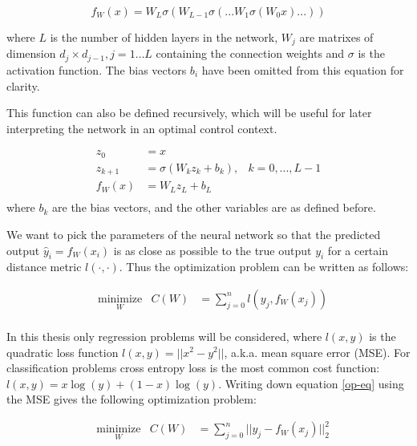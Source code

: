 \begin{equation}
         f_W(x) = W_L\sigma(W_{L-1}\sigma(...W_1\sigma(W_0x)...))
\end{equation}

where $L$ is the number of hidden layers in the network, $W_j$ are matrixes of dimension $d_j \times d_{j-1}, j=1 \dots L$ containing the connection weights and $\sigma$ is the activation function. The bias vectors $b_i$ have been omitted from this equation for clarity.

This function can also be defined recursively, which will be useful for later interpreting the network in an optimal control context.

\begin{equation}
	\begin{aligned}
	z_0 &= x \\
	z_{k+1} &= \sigma(W_kz_k + b_k), & k = 0,...,L-1 \\
	f_W(x) &= W_Lz_L + b_L \\
	\end{aligned}
\label{st-eq}
\end{equation}
where $b_k$ are the bias vectors, and the other variables are as defined before.

We want to pick the parameters of the neural network so that the predicted output $\hat{y}_i = f_W(x_i)$ is as close as possible to the true output $y_i$ for a certain distance metric $\mathit{l(\cdot,\cdot)}$. Thus the optimization problem can be written as follows:

\begin{equation}
\begin{aligned}
& \underset{W}{\text{minimize}}
& C(W) &= \sum\limits_{j=0}^{n}l(y_j,f_W(x_j)) \\
\end{aligned}
\label{op-eq}
\end{equation}

In this thesis only regression problems will be considered, where $l(x,y)$ is the quadratic loss function $l(x,y) = ||x^2-y^2||$, a.k.a. mean square error (MSE). For classification problems cross entropy loss is the most common cost function: $l(x,y) = x\log(y)+(1-x)\log(y)$. Writing down equation \ref{op-eq} using the MSE gives the following optimization problem:

\begin{equation}
\begin{aligned}
& \underset{W}{\text{minimize}}
& C(W) &= \sum\limits_{j=0}^{n}||y_j - f_W(x_j)||^2_2 \\
\end{aligned}
\label{op2-eq}
\end{equation}


